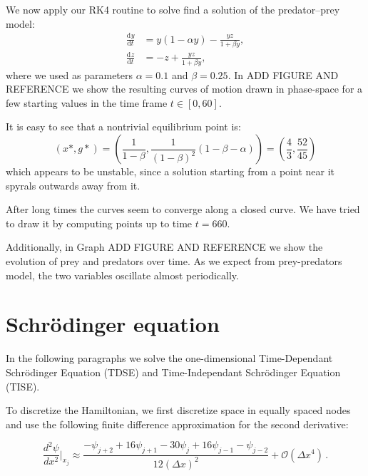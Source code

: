 \documentclass[a4paper,11]{article}
\newcommand{\derivative}[3]{\frac{\mathrm{d}^{#2} #3 }{\mathrm{d} #1^{#2}}}
\begin{document}
We now apply our RK4 routine to solve find a solution of the predator--prey
model:
\[  
	\begin{split}
		\derivative{t}{}{y} &= y(1-\alpha y) - \frac{yz}{1+\beta y}, \\[2mm]
		\derivative{t}{}{z} &= -z + \frac{yz}{1+\beta y},
	\end{split}
\]
where we used as parameters $\alpha = 0.1$ and $\beta=0.25$. 
In ADD FIGURE AND REFERENCE we show the resulting curves of motion drawn
in phase-space for a few starting values in the time frame $t\in [0,60]$.

It is easy to see that a nontrivial equilibrium point is:
\[
	(x*,g*) = \left( \frac{1}{1-\beta}, \frac{1}{(1-\beta)^{2}}(1-\beta-\alpha){}
		\right) = \left(\frac{4}{3}, \frac{52}{45}\right)
\]
which appears to be unstable, since a solution starting from a point near it 
spyrals outwards away from it.

After long times the curves seem to converge along a closed curve. We have tried
to draw it by computing points up to time $t=660$.

Additionally, in Graph ADD FIGURE AND REFERENCE we show the evolution of prey 
and predators over time. As we expect from prey-predators model, the two 
variables oscillate almost periodically.


\section{Schrödinger equation}

In the following paragraphs we solve the one-dimensional
Time-Dependant Schrödinger Equation
(TDSE) and Time-Independant Schrödinger Equation (TISE).

To discretize the Hamiltonian, we first discretize space in equally spaced 
nodes and use the following finite difference 
approximation for the second derivative:

\begin{equation}\label{eq:2nd_derivative_finite_difference}
    \frac{d^2 \psi}{dx^2}\Big|_{x_j} \approx
    \frac{-\psi_{j+2} + 16 \psi_{j+1} - 30 \psi_j + 16 \psi_{j-1} - \psi_{j-2}}{12 (\Delta x)^2} 
    + \mathcal{O}(\Delta x^4)\,.
\end{equation}
\end{document}
